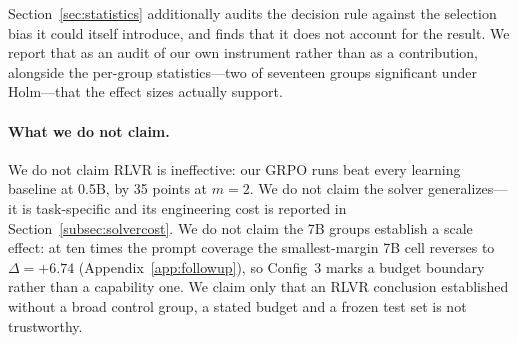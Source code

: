 Section~\ref{sec:statistics} additionally audits the decision rule against the
selection bias it could itself introduce, and finds that it does not account for
the result. We report that as an audit of our own instrument rather than as a
contribution, alongside the per-group statistics---two of seventeen groups
significant under Holm---that the effect sizes actually support.

\paragraph{What we do not claim.}
We do not claim RLVR is ineffective: our GRPO runs beat every learning baseline
at 0.5B, by 35 points at $m{=}2$. We do not claim the solver generalizes---it is
task-specific and its engineering cost is reported in
Section~\ref{subsec:solvercost}. We do not claim the 7B groups establish a
scale effect: at ten times the prompt coverage the smallest-margin 7B cell
reverses to $\Delta = +6.74$ (Appendix~\ref{app:followup}), so Config~3 marks a
budget boundary rather than a capability one. We claim only that an RLVR
conclusion established without a broad control group, a stated budget and a
frozen test set is not trustworthy.

